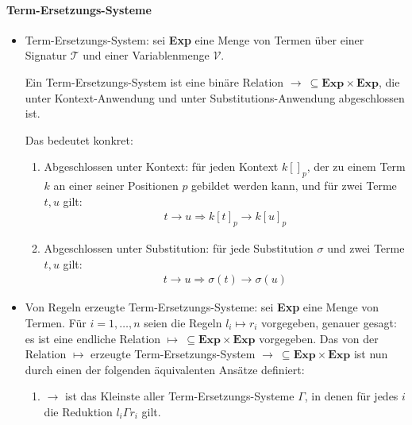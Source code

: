 \documentclass[
  a4paper,
  11pt,
]{scrartcl}
\newcommand{\Tc}{\mathcal{T}}
\newcommand{\Vc}{\mathcal{V}}
\begin{document}
\paragraph{Term-Ersetzungs-Systeme}
\label{par:term_ersetzungs_systeme}

\begin{itemize}
  \item Term-Ersetzungs-System: sei \textbf{Exp} eine Menge von Termen über
    einer Signatur $\Tc$ und einer Variablenmenge $\Vc$.

    Ein Term-Ersetzungs-System ist eine binäre Relation $\rightarrow \ \subseteq
    \textbf{Exp} \times \textbf{Exp}$, die unter Kontext-Anwendung und unter
    Substitutions-Anwendung abgeschlossen ist.

    Das bedeutet konkret:
    \begin{enumerate}
      \item Abgeschlossen unter Kontext: für jeden Kontext ${k[]}_p$, der zu einem
        Term $k$ an einer seiner Positionen $p$ gebildet werden kann, und für
        zwei Terme $t, u$ gilt:
        \begin{align*}
          t \rightarrow u \Rightarrow {k[t]}_p \rightarrow {k[u]}_p
        \end{align*}

      \item Abgeschlossen unter Substitution: für jede Substitution $\sigma$ und
        zwei Terme $t, u$ gilt:
        \begin{align*}
          t \rightarrow u \Rightarrow \sigma(t) \rightarrow \sigma(u)
        \end{align*}
    \end{enumerate}

  \item Von Regeln erzeugte Term-Ersetzungs-Systeme: sei \textbf{Exp} eine Menge
    von Termen. Für $i = 1, \dots, n$ seien die Regeln $l_i \mapsto r_i$
    vorgegeben, genauer gesagt: es ist eine endliche Relation $\mapsto \
    \subseteq \textbf{Exp} \times \textbf{Exp}$ vorgegeben. Das von der Relation
    $\mapsto$ erzeugte Term-Ersetzungs-System $\rightarrow \ \subseteq
    \textbf{Exp} \times \textbf{Exp}$ ist nun durch einen der folgenden
    äquivalenten Ansätze definiert:
    \begin{enumerate}
      \item $\rightarrow$ ist das Kleinste aller Term-Ersetzungs-Systeme
        $\Gamma$, in denen für jedes $i$ die Reduktion $l_i \Gamma r_i$ gilt.


\end{enumerate}
\end{itemize}
\end{document}
